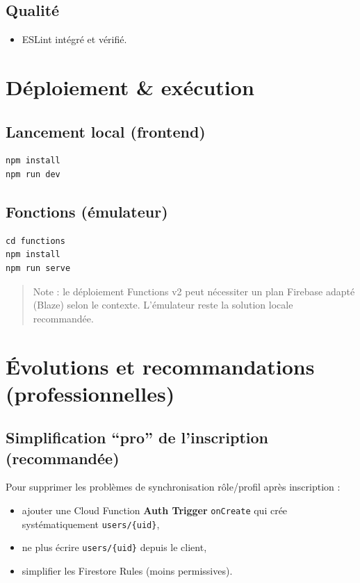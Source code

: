 \documentclass[12pt,a4paper]{article}
\begin{document}
\subsection{Qualité}
\begin{itemize}[leftmargin=*]
  \item ESLint intégré et vérifié.
\end{itemize}

\section{Déploiement \& exécution}
\subsection{Lancement local (frontend)}
\begin{lstlisting}[style=bash]
npm install
npm run dev
\end{lstlisting}

\subsection{Fonctions (émulateur)}
\begin{lstlisting}[style=bash]
cd functions
npm install
npm run serve
\end{lstlisting}

\begin{quote}
Note : le déploiement Functions v2 peut nécessiter un plan Firebase adapté (Blaze) selon le contexte. L’émulateur reste la solution locale recommandée.
\end{quote}

\section{Évolutions et recommandations (professionnelles)}
\subsection{Simplification “pro” de l’inscription (recommandée)}
Pour supprimer les problèmes de synchronisation rôle/profil après inscription :
\begin{itemize}[leftmargin=*]
  \item ajouter une Cloud Function \textbf{Auth Trigger} \texttt{onCreate} qui crée systématiquement \texttt{users/\{uid\}},
  \item ne plus écrire \texttt{users/\{uid\}} depuis le client,
  \item simplifier les Firestore Rules (moins permissives).
\end{itemize}
\end{document}
